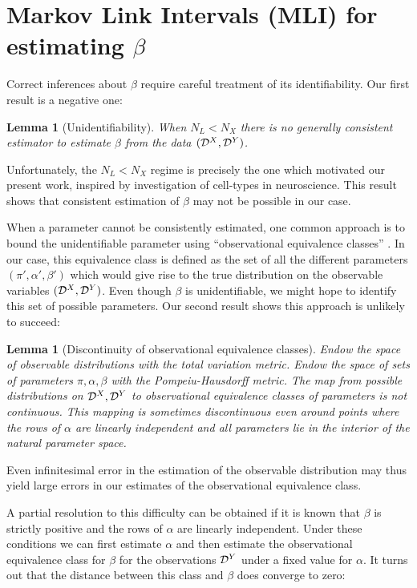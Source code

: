 \documentclass{article}
\newtheorem{lemma}[thm]{Lemma}
\theoremstyle{definition}
\begin{document}
\section{Markov Link Intervals (MLI) for estimating $\beta$}

Correct inferences about $\beta$ require careful treatment of its identifiability.  Our first result is a negative one:

\begin{lemma}[Unidentifiability]  \label{lem:unident} When $N_L<N_X$ there is no generally consistent estimator to estimate $\beta$ from the data $(\mathcal{D}^X,\mathcal{D}^Y)$.  
\end{lemma}

Unfortunately, the $N_L<N_X$ regime is precisely the one which motivated our present work, inspired by investigation of cell-types in neuroscience.  This result shows that consistent estimation of $\beta$ may not be possible in our case.

When a parameter cannot be consistently estimated, one common approach is to bound the unidentifiable parameter using  ``observational equivalence classes'' \cite{paulino1994identifiability,hauser2012characterization,tong1991indeterminacy}.  In our case, this equivalence class is defined as the set of all the different parameters $(\pi',\alpha',\beta')$ which would give rise to the true distribution on the observable variables $(\mathcal{D}^X,\mathcal{D}^Y)$.  Even though $\beta$ is unidentifiable, we might hope to identify this set of possible parameters.  Our second result shows this approach is unlikely to succeed:

\begin{lemma}[Discontinuity of observational equivalence classes]  \label{lem:noobseq} Endow the space of observable distributions with the total variation metric.  Endow the space of sets of parameters $\pi,\alpha,\beta$ with the Pompeiu-Hausdorff metric.  The map from possible distributions on $\mathcal{D}^X,\mathcal{D}^Y$ to observational equivalence classes of parameters is not continuous.   This mapping is sometimes discontinuous even around points where the rows of $\alpha$ are linearly independent and all parameters lie in the interior of the natural parameter space.  
\end{lemma}

Even infinitesimal error in the estimation of the observable distribution may thus yield large errors in our estimates of the observational equivalence class.

A partial resolution to this difficulty can be obtained if it is known that $\beta$ is strictly positive and the rows of $\alpha$ are linearly independent.  Under these conditions we can first estimate $\alpha$ and then estimate the observational equivalence class for $\beta$ for the observations $\mathcal{D}^Y$ under a fixed value for $\alpha$.  It turns out that the distance between this class and $\beta$ does converge to zero:
\end{document}
